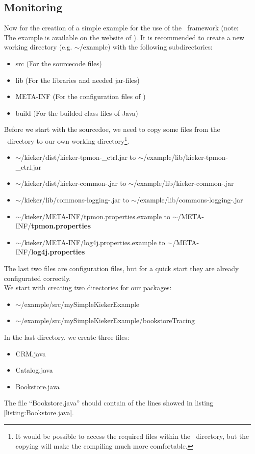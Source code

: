 \documentclass[a4paper, oneside, 11pt]{scrartcl}
\begin{document}
\subsection{Monitoring}
Now for the creation of a simple example for the use of the \Kieker\ framework (note: The example is available on the website of \Kieker). It is recommended to create a new working directory (e.g. $\sim$/example) with the following subdirectories:
\begin{itemize}
  \item src (For the sourcecode files)
  \item lib (For the libraries and needed jar-files)
  \item META-INF (For the configuration files of \Kieker)
  \item build (For the builded class files of Java)
\end{itemize}
Before we start with the sourcedoe, we need to copy some files from the \Kieker\ directory to our own working directory\footnote{It would be possible to access the required files within the \Kieker\ directory, but the copying will make the compiling much more comfortable.}.
\begin{itemize}
  \item $\sim$/kieker/dist/kieker-tpmon-\version\_ctrl.jar to $\sim$/example/lib/kieker-tpmon-\version\_ctrl.jar
  \item $\sim$/kieker/dist/kieker-common-\version.jar to $\sim$/example/lib/kieker-common-\version.jar
  \item $\sim$/kieker/lib/commons-logging-\version.jar to $\sim$/example/lib/commons-logging-\version.jar
  \item $\sim$/kieker/META-INF/tpmon.properties.example to $\sim$/META-INF/\textbf{tpmon.properties}
  \item $\sim$/kieker/META-INF/log4j.properties.example to $\sim$/META-INF/\textbf{log4j.properties}
\end{itemize}
The last two files are configuration files, but for a quick start they are already configurated correctly.\\

We start with creating two directories for our packages:
\begin{itemize}
  \item $\sim$/example/src/mySimpleKiekerExample
  \item $\sim$/example/src/mySimpleKiekerExample/bookstoreTracing
\end{itemize}
In the last directory, we create three files: 
\begin{itemize}
  \item CRM.java
  \item Catalog.java
  \item Bookstore.java
\end{itemize}
The file ``Bookstore.java'' should contain of the lines showed in listing \ref{listing:Bookstore.java}.
\end{document}
